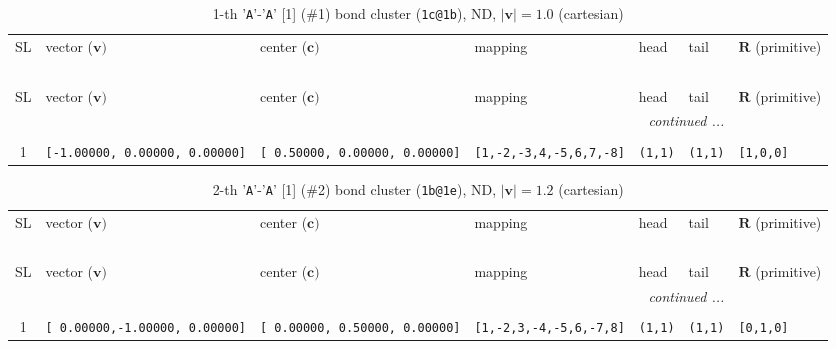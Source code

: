 \documentclass[fleqn,10pt,landscape]{jsarticle}
\begin{document}
\renewcommand{\arraystretch}{1.6}
\begin{longtable}[l]{cllllll}
\captionsetup{justification=raggedright, singlelinecheck=off}
\caption{1-th '\texttt{A}'-'\texttt{A}' [1] (\#1) bond cluster (\texttt{1c@1b}), ND, $|\bm{v}|=1.0$ (cartesian)}
 \\
 \hline \hline
SL & vector ($\bm{v})$ & center ($\bm{c})$ & mapping & head & tail & $\bm{R}$ (primitive) \\ \hline \endfirsthead

\multicolumn{6}{l}{\tablename\ \thetable{}} \\
 \hline \hline
SL & vector ($\bm{v})$ & center ($\bm{c})$ & mapping & head & tail & $\bm{R}$ (primitive) \\ \hline \endhead

 \hline \hline
\multicolumn{6}{r}{\footnotesize\it continued ...} \\ \endfoot

 \hline \hline
\multicolumn{6}{r}{} \\ \endlastfoot

1 & \texttt{[-1.00000, 0.00000, 0.00000]} & \texttt{[ 0.50000, 0.00000, 0.00000]} & \texttt{[1,-2,-3,4,-5,6,7,-8]} & \texttt{(1,1)} & \texttt{(1,1)} & \texttt{[1,0,0]} \\
\end{longtable}
\renewcommand{\arraystretch}{1.6}
\begin{longtable}[l]{cllllll}
\captionsetup{justification=raggedright, singlelinecheck=off}
\caption{2-th '\texttt{A}'-'\texttt{A}' [1] (\#2) bond cluster (\texttt{1b@1e}), ND, $|\bm{v}|=1.2$ (cartesian)}
 \\
 \hline \hline
SL & vector ($\bm{v})$ & center ($\bm{c})$ & mapping & head & tail & $\bm{R}$ (primitive) \\ \hline \endfirsthead

\multicolumn{6}{l}{\tablename\ \thetable{}} \\
 \hline \hline
SL & vector ($\bm{v})$ & center ($\bm{c})$ & mapping & head & tail & $\bm{R}$ (primitive) \\ \hline \endhead

 \hline \hline
\multicolumn{6}{r}{\footnotesize\it continued ...} \\ \endfoot

 \hline \hline
\multicolumn{6}{r}{} \\ \endlastfoot

1 & \texttt{[ 0.00000,-1.00000, 0.00000]} & \texttt{[ 0.00000, 0.50000, 0.00000]} & \texttt{[1,-2,3,-4,-5,6,-7,8]} & \texttt{(1,1)} & \texttt{(1,1)} & \texttt{[0,1,0]} \\
\end{longtable}
\end{document}
